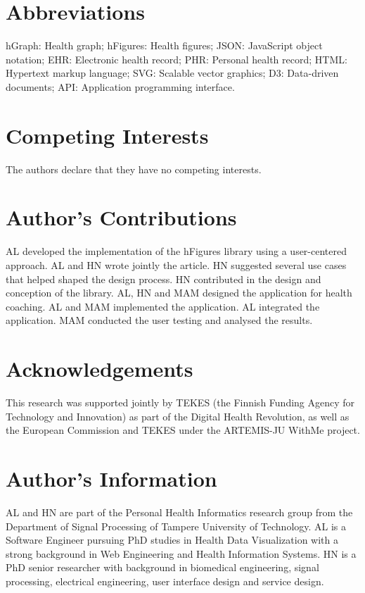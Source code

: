 \documentclass[twocolumn]{bmcart}%
\begin{document}
\begin{backmatter}

\section*{Abbreviations}
    hGraph: Health graph; hFigures: Health figures; JSON: JavaScript object notation; EHR: Electronic health record; PHR: Personal health record; HTML: Hypertext markup language; SVG: Scalable vector graphics; D3: Data-driven documents; API: Application programming interface.

\section*{Competing Interests}
    The authors declare that they have no competing interests.

\section*{Author's Contributions}
AL developed the implementation of the hFigures library using a user-centered approach. AL and HN wrote jointly the article. HN suggested several use cases that helped shaped the design process. HN contributed in the design and conception of the library. AL, HN and MAM designed the application for health coaching. AL and MAM implemented the application. AL integrated the application. MAM conducted the user testing and analysed the results.
    
\section*{Acknowledgements}
This research was supported jointly by TEKES (the Finnish Funding Agency for Technology and Innovation) as part of the Digital Health Revolution, as well as the European Commission and TEKES under the ARTEMIS-JU WithMe project.
  
\section*{Author's Information}
AL and HN are part of the Personal Health Informatics research group from the Department of Signal Processing of Tampere University of Technology. AL is a Software Engineer pursuing PhD studies in Health Data Visualization with a strong background in Web Engineering and Health Information Systems. HN is a PhD senior researcher with background in biomedical engineering, signal processing, electrical engineering, user interface design and service design.


\end{backmatter}
\end{document}
